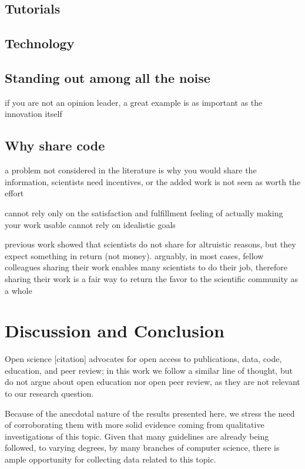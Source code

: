 \documentclass[12pt]{article}
\begin{document}
\subsection{Tutorials}
\label{sec:org00f4976}

\subsection{Technology}
\label{sec:org5961537}

\subsection{Standing out among all the noise}
\label{sec:org681182e}
if you are not an opinion leader, a great example is as important as the innovation itself

\subsection{Why share code}
\label{sec:orgd0e1a8f}
a problem not considered in the literature is why you would share the information, scientists need incentives, or the added work is not seen as worth the effort

cannot rely only on the satisfaction and fulfillment feeling of actually making your work usable
cannot rely on idealistic goals

previous work showed that scientists do not share for altruistic reasons, but they expect something in return (not money). arguably, in most cases, fellow colleagues sharing their work enables many scientists to do their job, therefore sharing their work is a fair way to return the favor to the scientific community as a whole


\section{Discussion and Conclusion}
\label{sec:orgc58f262}
Open science [citation] advocates for open access to publications, data, code, education, and peer review; in this work we follow a similar line of thought, but do not argue about open education nor open peer review, as they are not relevant to our research question.

Because of the anecdotal nature of the results presented here, we stress the need of corroborating them with more solid evidence coming from qualitative investigations of this topic. Given that many guidelines are already being followed, to varying degrees, by many branches of computer science, there is ample opportunity for collecting data related to this topic.
\end{document}
